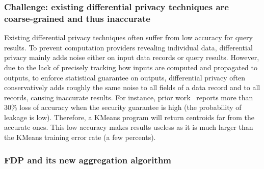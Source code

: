 \vspace{-.15in}
\subsubsection{Challenge: existing differential privacy techniques are 
coarse-grained and thus inaccurate} 
\label{sec:obj2-problem}\vspace{-.075in}

Existing differential privacy techniques often suffer from low accuracy for 
query results. To prevent computation providers revealing individual 
data, differential privacy mainly adds noise either on input data 
records or query results. However, due to the lack of precisely tracking 
how inputs are computed and propagated to outputs, to enforce statistical 
guarantee on outputs, differential privacy often conservatively adds roughly 
the same noise to all fields of a data record and to all records, causing 
inaccurate results. For instance, prior work~\cite{differentialresult:vldb15} 
reports more than 30\% loss of accuracy when the security guarantee is high 
(the probability of leakage is low). Therefore, a KMeans program will return 
centroids far from the accurate ones. This low accuracy makes results useless as 
it is much larger than the KMeans training error rate (a few percents).

\vspace{-.15in}
\subsubsection{FDP and its new aggregation algorithm} 
\label{sec:fdp}\vspace{-.075in}

